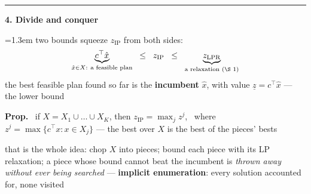 \documentclass[10pt]{article}
\newcommand{\beat}[2]{%
  \par\medskip\needspace{8\baselineskip}%
  {\color{ruleink}\rule{\textwidth}{1pt}}\par\nobreak\vspace{2pt}
  {\large\bfseries #1.\; #2}\par\nobreak\vspace{3pt}}
\newenvironment{board}{%
  \par\vspace{2pt}
  \begingroup\leftskip=1.3em\relax}{%
  \par\endgroup\vspace{2pt}}
\begin{document}
\beat{4}{Divide and conquer}
\begin{board}
two bounds squeeze $z_{\mathrm{IP}}$ from both sides:
\[
  \underbrace{c^{\top}\hat{x}}_{\hat{x} \in X:\ \text{a feasible plan}}
  \;\;\le\;\; z_{\mathrm{IP}} \;\;\le\;\;
  \underbrace{z_{\mathrm{LPR}}}_{\text{a relaxation (\S 1)}}
\]
the best feasible plan found so far is the \textbf{incumbent} $\hat{x}$, with value $\underline{z} = c^{\top}\hat{x}$ --- the lower bound
\vspace{3pt}

\textbf{Prop.} \ if $X = X_1 \cup \dots \cup X_K$, then $z_{\mathrm{IP}} = \max_j z^j$, \ where $z^j = \max\{c^{\top}x : x \in X_j\}$
--- the best over $X$ is the best of the pieces' bests
\vspace{3pt}

that is the whole idea: chop $X$ into pieces; bound each piece with its LP relaxation; a piece whose bound cannot beat the
incumbent is \emph{thrown away without ever being searched} --- \textbf{implicit enumeration}: every solution accounted for, none visited
\end{board}
\end{document}
